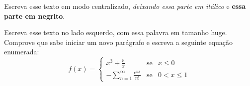 \documentclass[11pt]{report}
\begin{document}
	\thispagestyle{empty}

	\begin{center}
	Escreva esse texto em modo centralizado, \textit{deixando essa parte em itálico} e \textbf{essa parte em negrito}.
	\end{center}
	
	\hspace*{\fill}Escreva esse texto no lado esquerdo, com essa {\huge palavra} em tamanho huge. \\
	
    Comprove que sabe iniciar um novo parágrafo e escreva a seguinte equação enumerada:
	$$
	f(x)=
	\left 
		\{
			\begin{array}{ccl}
				x^3 + \frac{5}{x} & \mbox {se} & x \leq 0 \\
				-\sum\limits_{n=1}^{\infty} \frac{e^{nx}}{n!} & \mbox{se} & 0 < x \leq 1
			\end{array}
	\right.
	$$
	
\end{document}
